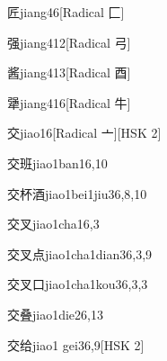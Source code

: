 \begin{entry}{匠}{jiang4}{6}[Radical 匚]
\end{entry}

\begin{entry}{强}{jiang4}{12}[Radical 弓]
\end{entry}

\begin{entry}{酱}{jiang4}{13}[Radical 酉]
\end{entry}

\begin{entry}{犟}{jiang4}{16}[Radical 牛]
\end{entry}

\begin{entry}{交}{jiao1}{6}[Radical 亠][HSK 2]
\end{entry}

\begin{entry}{交班}{jiao1ban1}{6,10}
\end{entry}

\begin{entry}{交杯酒}{jiao1bei1jiu3}{6,8,10}
\end{entry}

\begin{entry}{交叉}{jiao1cha1}{6,3}
\end{entry}

\begin{entry}{交叉点}{jiao1cha1dian3}{6,3,9}
\end{entry}

\begin{entry}{交叉口}{jiao1cha1kou3}{6,3,3}
\end{entry}

\begin{entry}{交叠}{jiao1die2}{6,13}
\end{entry}

\begin{entry}{交给}{jiao1 gei3}{6,9}[HSK 2]
\end{entry}

